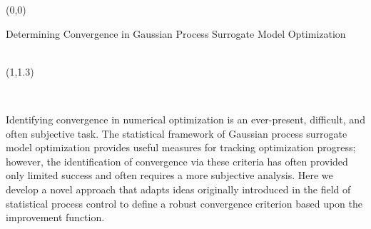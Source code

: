 \documentclass[a0,landscape]{a0poster}
\newcommand{\co}[2]{{{\bf \color{#1}{#2}}}}
\begin{document}
\begin{textblock}{25}(0,0)

\begin{center}
\vspace{1cm}
{\veryHuge  \textsf{Determining Convergence in Gaussian Process Surrogate Model Optimization}}\\
\vspace{1cm}
\\
\vspace{1cm}
\end{center}

\end{textblock}

%

\begin{textblock}{6}(1,1.3)
\begin{center}
{\LARGE \textsc{\co{darkaqua}{Abstract}}}\\
\end{center}
\medskip

\large
\noindent 
Identifying convergence in numerical optimization is an ever-present, difficult, and often subjective task. 
The statistical framework of Gaussian process surrogate model optimization provides useful measures for tracking optimization progress; however, the identification of convergence via these criteria has often provided only limited success and often requires a more subjective analysis. 
Here we develop a novel approach that adapts ideas originally introduced in the field of statistical process control to define a robust convergence criterion based upon the improvement function. 
\end{textblock}
\end{document}
